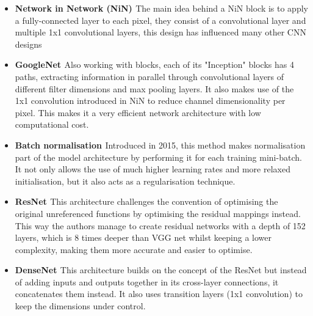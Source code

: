 \documentclass{article}
\begin{document}
\begin{itemize}

    \item \textbf{Network in Network (NiN) \cite{lin2014network}} The main idea behind a NiN block is to apply a fully-connected layer to each pixel, they consist of a convolutional layer and multiple 1x1 convolutional layers, this design has influenced many other CNN designs
 
    \item \textbf{GoogleNet \cite{7298594}} Also working with blocks, each of its "Inception" blocks has 4 paths, extracting information in parallel through convolutional layers of different filter dimensions and max pooling layers. It also makes use of the 1x1 convolution introduced in NiN to reduce channel dimensionality per pixel. This makes it a very efficient network architecture with low computational cost.
    
    \item \textbf{Batch normalisation \cite{ioffe2015batch}} Introduced in 2015, this method makes normalisation part of the model architecture by performing it for each training mini-batch. It  not only allows the use of much higher learning rates and more relaxed initialisation, but it also acts as a regularisation technique.
    
    \item \textbf{ResNet \cite{he2015deep}} This architecture challenges the convention of optimising the original unreferenced functions by optimising the residual mappings instead. This way the authors manage to create residual networks with a depth of 152 layers, which is 8 times deeper than VGG net whilst keeping a lower complexity, making them more accurate and easier to optimise. 
    \item \textbf{DenseNet \cite{8099726}} This architecture builds on the concept of the ResNet but instead of adding inputs and outputs together in its cross-layer connections, it concatenates them instead. It also uses transition layers (1x1 convolution) to keep the dimensions under control.

\end{itemize}


\end{document}
